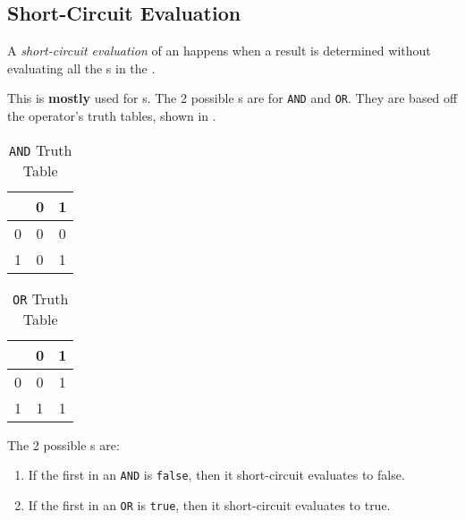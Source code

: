 \subsection{Short-Circuit Evaluation}\label{subsec:Short_Circuit_Evaluation}
\begin{definition}\label{def:Short_Circuit_Evaluation}
  A \emph{short-circuit evaluation} of an  happens when a result is determined without evaluating all the s in the .
\end{definition}

This is \textbf{mostly} used for s.
The 2 possible s are for \texttt{AND} and \texttt{OR}.
They are based off the operator's truth tables, shown in .

\begin{table}[h!]
  \centering
  \begin{tabular}{|c|cc|}
    \toprule
    & 0 & 1 \\
    \midrule
    0 & 0 & 0 \\
    1 & 0 & 1 \\
    \bottomrule
  \end{tabular}
  \caption{\texttt{AND} Truth Table}
  \label{tab:AND_Truth_Table}
\end{table}

\begin{table}[h!]
  \centering
  \begin{tabular}{|c|cc|}
    \toprule
    & 0 & 1 \\
    \midrule
    0 & 0 & 1 \\
    1 & 1 & 1 \\
    \bottomrule
  \end{tabular}
  \caption{\texttt{OR} Truth Table}
  \label{tab:OR_Truth_Table}
\end{table}

The 2 possible s are:
\begin{enumerate}[noitemsep]
\item If the first  in an \texttt{AND}  is \texttt{false}, then it short-circuit evaluates to false.
\item If the first  in an \texttt{OR}  is \texttt{true}, then it short-circuit evaluates to true.
\end{enumerate}

